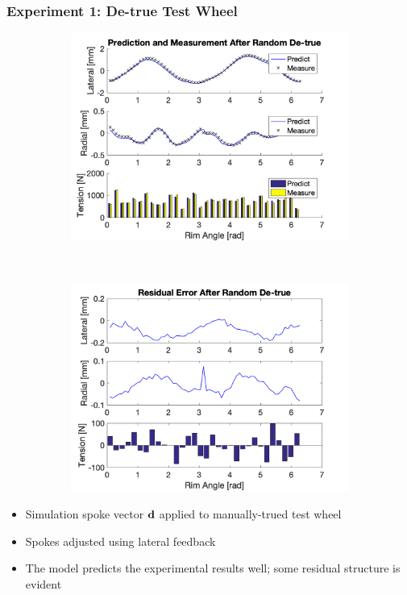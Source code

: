 \documentclass[mathserif]{beamer}
\begin{document}
\begin{frame}
\frametitle{Experiment 1: De-true Test Wheel}
\begin{figure}
        \centering
        \begin{subfigure}[b]{0.45\textwidth}
            \includegraphics[width=\textwidth]{detune_exp}
        \end{subfigure}
        ~
        \begin{subfigure}[b]{0.45\textwidth}
            \includegraphics[width=\textwidth]{detune_exp_err}
        \end{subfigure}
\end{figure}
\begin{itemize}
    \item Simulation spoke vector $\bf d$ applied to manually-trued test wheel
    \item Spokes adjusted using lateral feedback
    \item The model predicts the experimental results well; some residual structure is evident
\end{itemize}
\end{frame}
\end{document}
